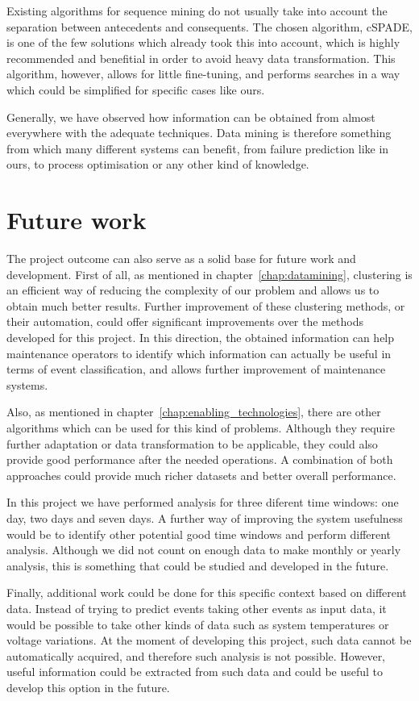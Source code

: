 Existing algorithms for sequence mining do not usually take into account the separation between antecedents and consequents. The chosen algorithm, cSPADE, is one of the few solutions which already took this into account, which is highly recommended and benefitial in order to avoid heavy data transformation. This algorithm, however, allows for little fine-tuning, and performs searches in a way which could be simplified for specific cases like ours.

Generally, we have observed how information can be obtained from almost everywhere with the adequate techniques. Data mining is therefore something from which many different systems can benefit, from failure prediction like in ours, to process optimisation or any other kind of knowledge.
 

\section{Future work}
The project outcome can also serve as a solid base for future work and development. First of all, as mentioned in chapter~\ref{chap:datamining}, clustering is an efficient way of reducing the complexity of our problem and allows us to obtain much better results. Further improvement of these clustering methods, or their automation, could offer significant improvements over the methods developed for this project. In this direction, the obtained information can help maintenance operators to identify which information can actually be useful in terms of event classification, and allows further improvement of maintenance systems.

Also, as mentioned in chapter~\ref{chap:enabling_technologies}, there are other algorithms which can be used for this kind of problems. Although they require further adaptation or data transformation to be applicable, they could also provide good performance after the needed operations. A combination of both approaches could provide much richer datasets and better overall performance.

In this project we have performed analysis for three diferent time windows: one day, two days and seven days. A further way of improving the system usefulness would be to identify other potential good time windows and perform different analysis. Although we did not count on enough data to make monthly or yearly analysis, this is something that could be studied and developed in the future.

Finally, additional work could be done for this specific context based on different data. Instead of trying to predict events taking other events as input data, it would be possible to take other kinds of data such as system temperatures or voltage variations. At the moment of developing this project, such data cannot be automatically acquired, and therefore such analysis is not possible. However, useful information could be extracted from such data and could be useful to develop this option in the future.